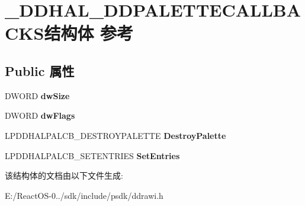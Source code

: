 \hypertarget{struct___d_d_h_a_l___d_d_p_a_l_e_t_t_e_c_a_l_l_b_a_c_k_s}{}\section{\+\_\+\+D\+D\+H\+A\+L\+\_\+\+D\+D\+P\+A\+L\+E\+T\+T\+E\+C\+A\+L\+L\+B\+A\+C\+K\+S结构体 参考}
\label{struct___d_d_h_a_l___d_d_p_a_l_e_t_t_e_c_a_l_l_b_a_c_k_s}
\subsection*{Public 属性}
\begin{DoxyCompactItemize}
\item 
\mbox{\label{struct___d_d_h_a_l___d_d_p_a_l_e_t_t_e_c_a_l_l_b_a_c_k_s_aebb28d230a57c146120f0c3746dc8747}} 
D\+W\+O\+RD {\bfseries dw\+Size}
\item 
\mbox{\label{struct___d_d_h_a_l___d_d_p_a_l_e_t_t_e_c_a_l_l_b_a_c_k_s_a518135b4d5f5edf3d65717a09fb30847}} 
D\+W\+O\+RD {\bfseries dw\+Flags}
\item 
\mbox{\label{struct___d_d_h_a_l___d_d_p_a_l_e_t_t_e_c_a_l_l_b_a_c_k_s_a26d3342697eae92a93ce47ffbea22d46}} 
L\+P\+D\+D\+H\+A\+L\+P\+A\+L\+C\+B\+\_\+\+D\+E\+S\+T\+R\+O\+Y\+P\+A\+L\+E\+T\+TE {\bfseries Destroy\+Palette}
\item 
\mbox{\label{struct___d_d_h_a_l___d_d_p_a_l_e_t_t_e_c_a_l_l_b_a_c_k_s_ac0df0371538781ffb880163cbd9a6e07}} 
L\+P\+D\+D\+H\+A\+L\+P\+A\+L\+C\+B\+\_\+\+S\+E\+T\+E\+N\+T\+R\+I\+ES {\bfseries Set\+Entries}
\end{DoxyCompactItemize}


该结构体的文档由以下文件生成\+:\begin{DoxyCompactItemize}
\item 
E\+:/\+React\+O\+S-\/0../sdk/include/psdk/ddrawi.\+h\end{DoxyCompactItemize}
